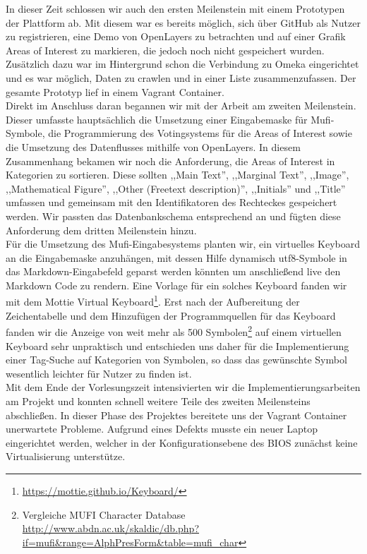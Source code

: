 \documentclass{article}
\begin{document}
In dieser Zeit schlossen wir auch den ersten Meilenstein mit einem Prototypen der Plattform ab. 
Mit diesem war es bereits möglich, sich über GitHub als Nutzer zu registrieren, eine Demo von OpenLayers zu betrachten und 
auf einer Grafik Areas of Interest zu markieren, die jedoch noch nicht gespeichert wurden. 
Zusätzlich dazu war im Hintergrund schon die Verbindung zu Omeka eingerichtet und es war möglich, 
Daten zu crawlen und in einer Liste zusammenzufassen. Der gesamte Prototyp lief in einem Vagrant Container.\\
Direkt im Anschluss daran begannen wir mit der Arbeit am zweiten Meilenstein. 
Dieser umfasste hauptsächlich die Umsetzung einer Eingabemaske für Mufi-Symbole, die Programmierung des Votingsystems für die Areas of Interest sowie die Umsetzung des Datenflusses mithilfe von OpenLayers.
In diesem Zusammenhang bekamen wir noch die Anforderung, die Areas of Interest in Kategorien zu sortieren. Diese sollten ,,Main Text'', ,,Marginal Text'', ,,Image'', ,,Mathematical Figure'', ,,Other (Freetext description)'', ,,Initials'' und ,,Title'' 
umfassen und gemeinsam mit den Identifikatoren des Rechteckes gespeichert werden.
Wir passten das Datenbankschema entsprechend an und fügten diese Anforderung dem dritten Meilenstein hinzu.\\
Für die Umsetzung des Mufi-Eingabesystems planten wir, ein virtuelles Keyboard an die Eingabemaske anzuhängen, 
mit dessen Hilfe dynamisch utf8-Symbole in das Markdown-Eingabefeld geparst werden könnten 
um anschließend live den Markdown Code zu rendern.
Eine Vorlage für ein solches Keyboard fanden wir mit dem Mottie Virtual Keyboard\footnote{\url{https://mottie.github.io/Keyboard/}}.
Erst nach der Aufbereitung der Zeichentabelle und dem Hinzufügen der Programmquellen für das Keyboard fanden wir die Anzeige von weit mehr als 500 Symbolen\footnote{Vergleiche MUFI Character Database\\\url{http://www.abdn.ac.uk/skaldic/db.php?if=mufi&range=AlphPresForm&table=mufi_char}} auf einem virtuellen Keyboard sehr unpraktisch und 
entschieden uns daher für die Implementierung einer Tag-Suche auf Kategorien von Symbolen, so dass das gewünschte Symbol wesentlich leichter für Nutzer zu finden ist.\\
Mit dem Ende der Vorlesungszeit intensivierten wir die Implementierungsarbeiten am Projekt und konnten schnell weitere Teile des zweiten Meilensteins abschließen. 
In dieser Phase des Projektes bereitete uns der Vagrant Container unerwartete Probleme. 
Aufgrund eines Defekts musste ein neuer Laptop eingerichtet werden, welcher in der Konfigurationsebene des BIOS zunächst keine Virtualisierung unterstütze.
\end{document}
